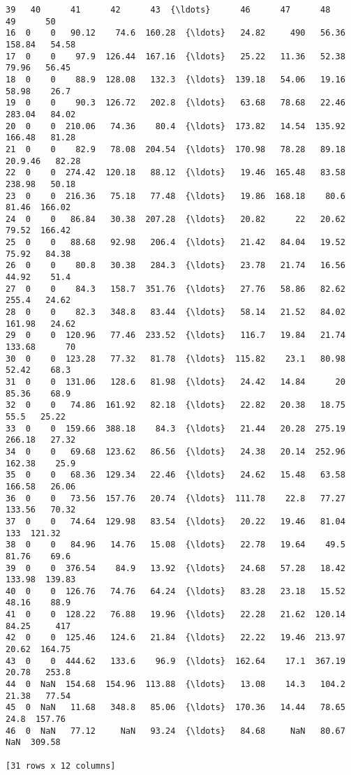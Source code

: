 \documentclass[11pt]{article}
\makeatletter
\newcommand{\boxspacing}{\kern\kvtcb@left@rule\kern\kvtcb@boxsep}
\newcommand{\prompt}[4]{
        {\ttfamily\llap{{\color{#2}[#3]:\hspace{3pt}#4}}\vspace{-\baselineskip}}
    }
\makeatother
\begin{document}
            \begin{tcolorbox}[breakable, size=fbox, boxrule=.5pt, pad at break*=1mm, opacityfill=0]
\prompt{Out}{outcolor}{ }{\boxspacing}
\begin{Verbatim}[commandchars=\\\{\}]
   39   40      41      42      43  {\ldots}      46      47      48       49      50
16  0    0   90.12    74.6  160.28  {\ldots}   24.82     490   56.36   158.84   54.58
17  0    0    97.9  126.44  167.16  {\ldots}   25.22   11.36   52.38    79.96   56.45
18  0    0    88.9  128.08   132.3  {\ldots}  139.18   54.06   19.16    58.98    26.7
19  0    0    90.3  126.72   202.8  {\ldots}   63.68   78.68   22.46   283.04   84.02
20  0    0  210.06   74.36    80.4  {\ldots}  173.82   14.54  135.92   166.48   81.28
21  0    0    82.9   78.08  204.54  {\ldots}  170.98   78.28   89.18  20.9.46   82.28
22  0    0  274.42  120.18   88.12  {\ldots}   19.46  165.48   83.58   238.98   50.18
23  0    0  216.36   75.18   77.48  {\ldots}   19.86  168.18    80.6    81.46  166.02
24  0    0   86.84   30.38  207.28  {\ldots}   20.82      22   20.62    79.52  166.42
25  0    0   88.68   92.98   206.4  {\ldots}   21.42   84.04   19.52    75.92   84.38
26  0    0    80.8   30.38   284.3  {\ldots}   23.78   21.74   16.56    44.92    51.4
27  0    0    84.3   158.7  351.76  {\ldots}   27.76   58.86   82.62    255.4   24.62
28  0    0    82.3   348.8   83.44  {\ldots}   58.14   21.52   84.02   161.98   24.62
29  0    0  120.96   77.46  233.52  {\ldots}   116.7   19.84   21.74   133.68      70
30  0    0  123.28   77.32   81.78  {\ldots}  115.82    23.1   80.98    52.42    68.3
31  0    0  131.06   128.6   81.98  {\ldots}   24.42   14.84      20    85.36    68.9
32  0    0   74.86  161.92   82.18  {\ldots}   22.82   20.38   18.75     55.5   25.22
33  0    0  159.66  388.18    84.3  {\ldots}   21.44   20.28  275.19   266.18   27.32
34  0    0   69.68  123.62   86.56  {\ldots}   24.38   20.14  252.96   162.38    25.9
35  0    0   68.36  129.34   22.46  {\ldots}   24.62   15.48   63.58   166.58   26.06
36  0    0   73.56  157.76   20.74  {\ldots}  111.78    22.8   77.27   133.56   70.32
37  0    0   74.64  129.98   83.54  {\ldots}   20.22   19.46   81.04      133  121.32
38  0    0   84.96   14.76   15.08  {\ldots}   22.78   19.64    49.5    81.76    69.6
39  0    0  376.54    84.9   13.92  {\ldots}   24.68   57.28   18.42   133.98  139.83
40  0    0  126.76   74.76   64.24  {\ldots}   83.28   23.18   15.52    48.16    88.9
41  0    0  128.22   76.88   19.96  {\ldots}   22.28   21.62  120.14    84.25     417
42  0    0  125.46   124.6   21.84  {\ldots}   22.22   19.46  213.97    20.62  164.75
43  0    0  444.62   133.6    96.9  {\ldots}  162.64    17.1  367.19    20.78   253.8
44  0  NaN  154.68  154.96  113.88  {\ldots}   13.08    14.3   104.2    21.38   77.54
45  0  NaN   11.68   348.8   85.06  {\ldots}  170.36   14.44   78.65     24.8  157.76
46  0  NaN   77.12     NaN   93.24  {\ldots}   84.68     NaN   80.67      NaN  309.58

[31 rows x 12 columns]
\end{Verbatim}
\end{tcolorbox}
        
\end{document}
